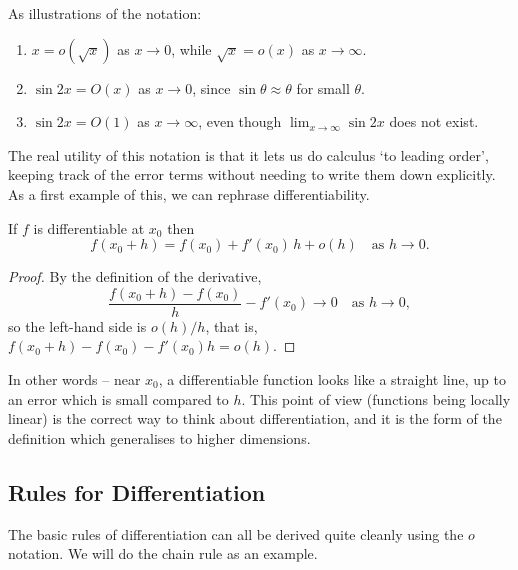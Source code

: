 \begin{example}
	As illustrations of the notation:
	\begin{enumerate}[label=(\roman*)]
		\item $x = o(\sqrt{x})$ as $x \to 0$, while $\sqrt{x} = o(x)$ as $x \to \infty$.
		\item $\sin 2x = O(x)$ as $x \to 0$, since $\sin \theta \approx \theta$ for small $\theta$.
		\item $\sin 2x = O(1)$ as $x \to \infty$, even though $\lim_{x \to \infty} \sin 2x$ does not exist.
	\end{enumerate}
\end{example}

The real utility of this notation is that it lets us do calculus `to leading order', keeping track of the error terms without needing to write them down explicitly. As a first example of this, we can rephrase differentiability.

\begin{proposition}
	If $f$ is differentiable at $x_0$ then
	$$
	f(x_0 + h) = f(x_0) + f'(x_0)\,h + o(h) \quad \text{as } h \to 0.
	$$
\end{proposition}
\begin{proof}
	By the definition of the derivative,
	$$
	\frac{f(x_0 + h) - f(x_0)}{h} - f'(x_0) \longrightarrow 0 \quad \text{as } h \to 0,
	$$
	so the left-hand side is $o(h)/h$, that is, $f(x_0 + h) - f(x_0) - f'(x_0) h = o(h)$.
\end{proof}

In other words -- near $x_0$, a differentiable function looks like a straight line, up to an error which is small compared to $h$. This point of view (functions being locally linear) is the correct way to think about differentiation, and it is the form of the definition which generalises to higher dimensions.

\subsection{Rules for Differentiation}

The basic rules of differentiation can all be derived quite cleanly using the $o$ notation. We will do the chain rule as an example.

